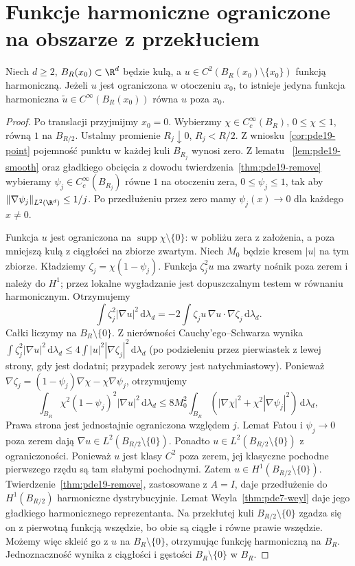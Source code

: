 \section{Funkcje harmoniczne ograniczone na obszarze z przekłuciem}
\label{sec:pde19-puncture}
\begin{twierdzenie}
\label{thm:pde19-bounded}
Niech $d\ge2$, $B_R(x_0)\subset\R^d$ będzie kulą,
a $u\in C^2(B_R(x_0)\setminus\{x_0\})$ funkcją harmoniczną.
Jeżeli $u$ jest ograniczona w otoczeniu $x_0$, to istnieje
jedyna funkcja harmoniczna $\widetilde u\in C^\infty(B_R(x_0))$
równa $u$ poza $x_0$.
\end{twierdzenie}
\begin{proof}
Po translacji przyjmijmy $x_0=0$. Wybierzmy
$\chi\in C_c^\infty(B_R)$, $0\le\chi\le1$, równą $1$
na $B_{R/2}$. Ustalmy promienie $R_j\downarrow0$,
$R_j<R/2$. Z wniosku~\ref{cor:pde19-point} pojemność
punktu w każdej kuli $B_{R_j}$ wynosi zero. Z lematu
~\ref{lem:pde19-smooth} oraz gładkiego obcięcia
z dowodu twierdzenia~\ref{thm:pde19-remove} wybieramy
$\psi_j\in C_c^\infty(B_{R_j})$ równe $1$ na
otoczeniu zera, $0\le\psi_j\le1$, tak aby
$\|\nabla\psi_j\|_{L^2(\R^d)}\le1/j$.
Po przedłużeniu przez zero mamy $\psi_j(x)\to0$
dla każdego $x\ne0$.

Funkcja $u$ jest ograniczona na
$\operatorname{supp}\chi\setminus\{0\}$:
w pobliżu zera z założenia, a poza mniejszą kulą
z ciągłości na zbiorze zwartym. Niech $M_0$ będzie
kresem $|u|$ na tym zbiorze. Kładziemy
$\zeta_j=\chi(1-\psi_j)$. Funkcja $\zeta_j^2u$
ma zwarty nośnik poza zerem i należy do $H^1$;
przez lokalne wygładzanie jest dopuszczalnym testem
w równaniu harmonicznym. Otrzymujemy
\[
 \int\zeta_j^2|\nabla u|^2\,\mathrm d\lambda_d
 =-2\int \zeta_j u\,\nabla u\cdot\nabla\zeta_j\,
 \mathrm d\lambda_d.
\]
Całki liczymy na $B_R\setminus\{0\}$.
Z nierówności Cauchy'ego--Schwarza wynika
$\int\zeta_j^2|\nabla u|^2\,\mathrm d\lambda_d
\le4\int |u|^2|\nabla\zeta_j|^2\,\mathrm d\lambda_d$
(po podzieleniu przez pierwiastek z lewej strony,
gdy jest dodatni; przypadek zerowy jest natychmiastowy).
Ponieważ $\nabla\zeta_j=(1-\psi_j)\nabla\chi-\chi\nabla\psi_j$,
otrzymujemy
\[
 \int_{B_R}\chi^2(1-\psi_j)^2|\nabla u|^2
 \,\mathrm d\lambda_d
 \le 8 M_0^2\int_{B_R}
 (|\nabla\chi|^2+\chi^2|\nabla\psi_j|^2)
 \,\mathrm d\lambda_d,
\]
Prawa strona jest jednostajnie ograniczona względem $j$.
Lemat Fatou i $\psi_j\to0$ poza zerem dają
$\nabla u\in L^2(B_{R/2}\setminus\{0\})$.
Ponadto $u\in L^2(B_{R/2}\setminus\{0\})$ z ograniczoności.
Ponieważ $u$ jest klasy $C^2$ poza zerem, jej klasyczne
pochodne pierwszego rzędu są tam słabymi pochodnymi. Zatem $u\in H^1(B_{R/2}\setminus\{0\})$.
Twierdzenie~\ref{thm:pde19-remove}, zastosowane z $A=I$,
daje przedłużenie do $H^1(B_{R/2})$ harmoniczne
dystrybucyjnie. Lemat Weyla~\ref{thm:pde7-weyl}
daje jego gładkiego harmonicznego reprezentanta.
Na przekłutej kuli $B_{R/2}\setminus\{0\}$ zgadza się on
z pierwotną funkcją wszędzie, bo obie są ciągłe i równe
prawie wszędzie. Możemy więc skleić go z $u$ na
$B_R\setminus\{0\}$, otrzymując funkcję harmoniczną
na $B_R$. Jednoznaczność wynika z ciągłości
i gęstości $B_R\setminus\{0\}$ w $B_R$.
\end{proof}

